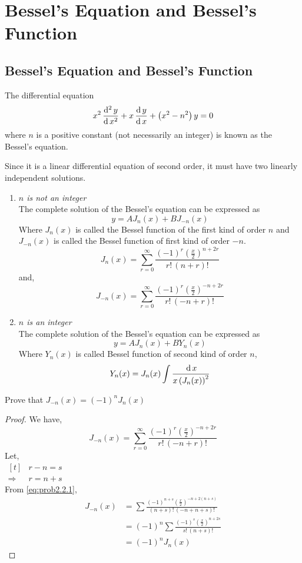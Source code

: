 \documentclass[../main-sheet.tex]{subfiles}
\begin{document}
\chapter{Bessel's Equation and Bessel's Function}
\section{Bessel's Equation and Bessel's Function}
The differential equation
\[
    x^2\,\frac{\mathrm{d}^{2}\, y}{\mathrm{d}\, x^{2}}+x\,\frac{\mathrm{d}\,y}{\mathrm{d}\,x}+\left( x^2-n^2 \right)y=0
\]
where $ n $ is a positive constant (not necessarily an integer) is known as the Bessel's equation.

Since it is a linear differential equation of second order, it must have two linearly independent solutions.
\begin{enumerate}[label={Case \arabic* :}]
    \item \emph{$ n $ is not an integer}\\
    The complete solution of the Bessel's equation can be expressed as 
    \[ 
        y=AJ_n(x)+BJ_{-n}(x) 
    \]
    Where $ J_n(x) $ is called the Bessel function of the first kind of order $ n $ and $ J_{-n}(x) $ is called the Bessel function of first kind of order $ -n $.
    \[
        J_n(x)=\sum_{r=0}^\infty \frac{(-1)^r\left( \frac{x}{2} \right)^{n+2r}}{r!\,(n+r)!}
    \]
    and,
    \[
        J_{-n}(x)=\sum_{r=0}^\infty \frac{(-1)^r\left( \frac{x}{2} \right)^{-n+2r}}{r!\,(-n+r)!}
    \]
    \item \emph{$ n $ is an integer}\\
    The complete solution of the Bessel's equation can be expressed as 
    \[
        y=AJ_n(x)+BY_{n}(x) 
    \]
    Where $ Y_n(x) $ is called Bessel function of second kind of order $ n $,
    \[Y_n(x)=J_n(x)\int \frac{\,\mathrm{d}\, x}{x\left( J_n(x) \right)^2}\]
\end{enumerate}
\begin{prob}
    Prove that $ J_{-n}(x)=(-1)^nJ_n(x) $
\end{prob}
\begin{proof}
    We have,
    \begin{equation}
        J_{-n}(x)=\sum_{r=0}^\infty \frac{(-1)^r\left( \frac{x}{2} \right)^{-n+2r}}{r!\,(-n+r)!} \label{eq:prob2.2.1}
    \end{equation}
    Let,\\
    \indent $ \begin{aligned}[t]
        &r-n=s\\
        \Rightarrow\, & r=n+s
    \end{aligned} $\\
    From \eqref{eq:prob2.2.1},
    \begin{align*}
        J_{-n}(x)&=\sum\frac{(-1)^{n+s}\left( \frac{x}{2} \right)^{-n+2(n+s)}}{(n+s)!\,(-n+n+s)!}\\
        &=(-1)^n\sum\frac{(-1)^{s}\left( \frac{x}{2} \right)^{n+2s}}{s!\,(n+s)!}\\
        &=(-1)^nJ_n(x)
    \end{align*}
\end{proof}
\end{document}
